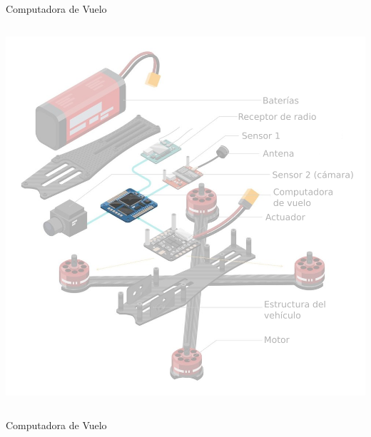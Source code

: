 \begin{frame}{Computadora de Vuelo}
\begin{columns}
\begin{overprint}
				\includegraphics[width=\textwidth]{img/partes_de_un_drone_transparencia.png}
			\end{overprint}
	\end{columns}
\end{frame}

\begin{frame}{Computadora de Vuelo}

\end{frame}

